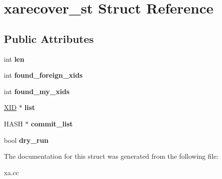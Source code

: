 \hypertarget{structxarecover__st}{}\section{xarecover\+\_\+st Struct Reference}
\label{structxarecover__st}
\subsection*{Public Attributes}
\begin{DoxyCompactItemize}
\item 
\mbox{\label{structxarecover__st_a15004f066645e8601d400780bf7d962d}} 
int {\bfseries len}
\item 
\mbox{\label{structxarecover__st_a8cdecc1a657fe1488c65888a309dd3a6}} 
int {\bfseries found\+\_\+foreign\+\_\+xids}
\item 
\mbox{\label{structxarecover__st_a977534c0f524350ca69d5cb9f1319550}} 
int {\bfseries found\+\_\+my\+\_\+xids}
\item 
\mbox{\label{structxarecover__st_a38f903ff4ce748574deb456f673f1a49}} 
\mbox{\hyperlink{structxid__t}{X\+ID}} $\ast$ {\bfseries list}
\item 
\mbox{\label{structxarecover__st_a80c2af582a348ce869cffd353c2ef84f}} 
H\+A\+SH $\ast$ {\bfseries commit\+\_\+list}
\item 
\mbox{\label{structxarecover__st_a88e22b08d37305b21dd8f5bd4a94d1cf}} 
bool {\bfseries dry\+\_\+run}
\end{DoxyCompactItemize}


The documentation for this struct was generated from the following file\+:\begin{DoxyCompactItemize}
\item 
xa.\+cc\end{DoxyCompactItemize}
